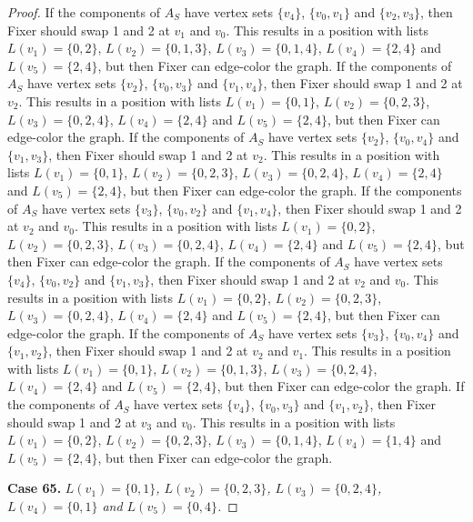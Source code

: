 \documentclass[12pt]{amsart}
\theoremstyle{plain}
\theoremstyle{definition}
\theoremstyle{remark}
\begin{document}
\begin{proof}
If the components of $A_S$ have vertex sets $\{v_4\}$, $\{v_0, v_1\}$ and $\{v_2, v_3\}$, then Fixer should swap 1 and 2 at $v_1$ and $v_0$. This results in a position with lists $L(v_1) = \{0, 2\}$, $L(v_2) = \{0, 1, 3\}$, $L(v_3) = \{0, 1, 4\}$, $L(v_4) = \{2, 4\}$ and $L(v_5) = \{2, 4\}$, but then Fixer can edge-color the graph.
If the components of $A_S$ have vertex sets $\{v_2\}$, $\{v_0, v_3\}$ and $\{v_1, v_4\}$, then Fixer should swap 1 and 2 at $v_2$. This results in a position with lists $L(v_1) = \{0, 1\}$, $L(v_2) = \{0, 2, 3\}$, $L(v_3) = \{0, 2, 4\}$, $L(v_4) = \{2, 4\}$ and $L(v_5) = \{2, 4\}$, but then Fixer can edge-color the graph.
If the components of $A_S$ have vertex sets $\{v_2\}$, $\{v_0, v_4\}$ and $\{v_1, v_3\}$, then Fixer should swap 1 and 2 at $v_2$. This results in a position with lists $L(v_1) = \{0, 1\}$, $L(v_2) = \{0, 2, 3\}$, $L(v_3) = \{0, 2, 4\}$, $L(v_4) = \{2, 4\}$ and $L(v_5) = \{2, 4\}$, but then Fixer can edge-color the graph.
If the components of $A_S$ have vertex sets $\{v_3\}$, $\{v_0, v_2\}$ and $\{v_1, v_4\}$, then Fixer should swap 1 and 2 at $v_2$ and $v_0$. This results in a position with lists $L(v_1) = \{0, 2\}$, $L(v_2) = \{0, 2, 3\}$, $L(v_3) = \{0, 2, 4\}$, $L(v_4) = \{2, 4\}$ and $L(v_5) = \{2, 4\}$, but then Fixer can edge-color the graph.
If the components of $A_S$ have vertex sets $\{v_4\}$, $\{v_0, v_2\}$ and $\{v_1, v_3\}$, then Fixer should swap 1 and 2 at $v_2$ and $v_0$. This results in a position with lists $L(v_1) = \{0, 2\}$, $L(v_2) = \{0, 2, 3\}$, $L(v_3) = \{0, 2, 4\}$, $L(v_4) = \{2, 4\}$ and $L(v_5) = \{2, 4\}$, but then Fixer can edge-color the graph.
If the components of $A_S$ have vertex sets $\{v_3\}$, $\{v_0, v_4\}$ and $\{v_1, v_2\}$, then Fixer should swap 1 and 2 at $v_2$ and $v_1$. This results in a position with lists $L(v_1) = \{0, 1\}$, $L(v_2) = \{0, 1, 3\}$, $L(v_3) = \{0, 2, 4\}$, $L(v_4) = \{2, 4\}$ and $L(v_5) = \{2, 4\}$, but then Fixer can edge-color the graph.
If the components of $A_S$ have vertex sets $\{v_4\}$, $\{v_0, v_3\}$ and $\{v_1, v_2\}$, then Fixer should swap 1 and 2 at $v_3$ and $v_0$. This results in a position with lists $L(v_1) = \{0, 2\}$, $L(v_2) = \{0, 2, 3\}$, $L(v_3) = \{0, 1, 4\}$, $L(v_4) = \{1, 4\}$ and $L(v_5) = \{2, 4\}$, but then Fixer can edge-color the graph.

\noindent\textbf{Case 65.  }\textit{$L(v_1) = \{0, 1\}$, $L(v_2) = \{0, 2, 3\}$, $L(v_3) = \{0, 2, 4\}$, $L(v_4) = \{0, 1\}$ and $L(v_5) = \{0, 4\}$.}


\end{proof}
\end{document}
